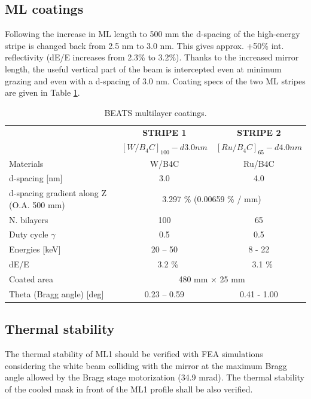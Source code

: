 \subsection{ML coatings}
Following the increase in ML length to 500 mm the d-spacing of the high-energy stripe is changed back from 2.5 nm to 3.0 nm. This gives approx. +50\% int. reflectivity (dE/E increases from 2.3\% to 3.2\%). Thanks to the increased mirror length, the useful vertical part of the beam is intercepted even at minimum grazing and even with a d-spacing of 3.0 nm. Coating specs of the two ML stripes are given in Table \ref{tab:coatings}.
\begin{center}
\begin{table}[h]
\begin{tabular}[bhp]{| l | c | c |}
\hline
 & \textbf{STRIPE 1} & \textbf{STRIPE 2} \\
 & \textbf{$[W/B_{4}C]_{100} - d 3.0 nm $} & \textbf{$[Ru/B_{4}C]_{65} - d 4.0 nm $} \\
\hline
Materials & W/B4C & Ru/B4C \\
d-spacing [nm] & 3.0 & 4.0 \\
d-spacing gradient along Z (O.A. 500 mm) & \multicolumn{2}{c|}{3.297 \% (0.00659 \% / mm)} \\ 
N. bilayers & 100 & 65 \\
Duty cycle $\gamma$ & 0.5 & 0.5 \\
Energies [keV] & 20 – 50 & 8 - 22 \\
dE/E & ~ 3.2 \% & ~ 3.1 \% \\
Coated area & \multicolumn{2}{c|}{480 mm × 25 mm} \\
Theta (Bragg angle) [deg] & 0.23 – 0.59 & 0.41 - 1.00 \\
\hline
\end{tabular}
\caption{\label{tab:coatings} BEATS multilayer coatings.}
\end{table}
\end{center}

\clearpage


% 

\clearpage
\subsection{Thermal stability}
The thermal stability of ML1 should be verified with FEA simulations considering the white beam colliding with the mirror at the maximum Bragg angle allowed by the Bragg stage motorization (34.9 mrad). The thermal stability of the cooled mask in front of the ML1 profile shall be also verified.\\

